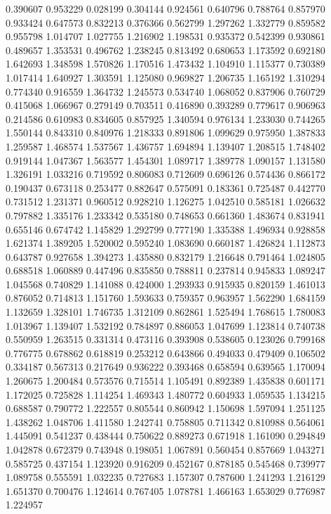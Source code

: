 0.390607
0.953229
0.028199
0.304144
0.924561
0.640796
0.788764
0.857970
0.933424
0.647573
0.832213
0.376366
0.562799
1.297262
1.332779
0.859582
0.955798
1.014707
1.027755
1.216902
1.198531
0.935372
0.542399
0.930861
0.489657
1.353531
0.496762
1.238245
0.813492
0.680653
1.173592
0.692180
1.642693
1.348598
1.570826
1.170516
1.473432
1.104910
1.115377
0.730389
1.017414
1.640927
1.303591
1.125080
0.969827
1.206735
1.165192
1.310294
0.774340
0.916559
1.364732
1.245573
0.534740
1.068052
0.837906
0.760729
0.415068
1.066967
0.279149
0.703511
0.416890
0.393289
0.779617
0.906963
0.214586
0.610983
0.834605
0.857925
1.340594
0.976134
1.233030
0.744265
1.550144
0.843310
0.840976
1.218333
0.891806
1.099629
0.975950
1.387833
1.259587
1.468574
1.537567
1.436757
1.694894
1.139407
1.208515
1.748402
0.919144
1.047367
1.563577
1.454301
1.089717
1.389778
1.090157
1.131580
1.326191
1.033216
0.719592
0.806083
0.712609
0.696126
0.574436
0.866172
0.190437
0.673118
0.253477
0.882647
0.575091
0.183361
0.725487
0.442770
0.731512
1.231371
0.960512
0.928210
1.126275
1.042510
0.585181
1.026632
0.797882
1.335176
1.233342
0.535180
0.748653
0.661360
1.483674
0.831941
0.655146
0.674742
1.145829
1.292799
0.777190
1.335388
1.496934
0.928858
1.621374
1.389205
1.520002
0.595240
1.083690
0.660187
1.426824
1.112873
0.643787
0.927658
1.394273
1.435880
0.832179
1.216648
0.791464
1.024805
0.688518
1.060889
0.447496
0.835850
0.788811
0.237814
0.945833
1.089247
1.045568
0.740829
1.141088
0.424000
1.293933
0.915935
0.820159
1.461013
0.876052
0.714813
1.151760
1.593633
0.759357
0.963957
1.562290
1.684159
1.132659
1.328101
1.746735
1.312109
0.862861
1.525494
1.768615
1.780083
1.013967
1.139407
1.532192
0.784897
0.886053
1.047699
1.123814
0.740738
0.550959
1.263515
0.331314
0.473116
0.393908
0.538605
0.123026
0.799168
0.776775
0.678862
0.618819
0.253212
0.643866
0.494033
0.479409
0.106502
0.334187
0.567313
0.217649
0.936222
0.393468
0.658594
0.639565
1.170094
1.260675
1.200484
0.573576
0.715514
1.105491
0.892389
1.435838
0.601171
1.172025
0.725828
1.114254
1.469343
1.480772
0.604933
1.059535
1.134215
0.688587
0.790772
1.222557
0.805544
0.860942
1.150698
1.597094
1.251125
1.438262
1.048706
1.411580
1.242741
0.758805
0.711342
0.810988
0.564061
1.445091
0.541237
0.438444
0.750622
0.889273
0.671918
1.161090
0.294849
1.042878
0.672379
0.743948
0.198051
1.067891
0.560454
0.857669
1.043271
0.585725
0.437154
1.123920
0.916209
0.452167
0.878185
0.545468
0.739977
1.089758
0.555591
1.032235
0.727683
1.157307
0.787600
1.241293
1.216129
1.651370
0.700476
1.124614
0.767405
1.078781
1.466163
1.653029
0.776987
1.224957
